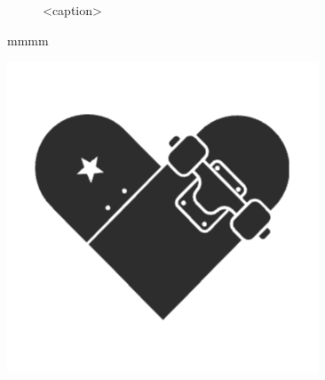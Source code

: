 \begin{figure}[htbp]%
    \centering
    
    \caption{<caption>}
    \label{<label>}
\end{figure}

\begin{theorem}
    \begin{minipage}{0.5\textwidth}%
        mmmm
    \end{minipage}
    \begin{minipage}{0.5\textwidth}
        \begin{center}
            \includegraphics[scale=0.6]{figure/logo.png}%
        \end{center}
    \end{minipage}
\end{theorem}

